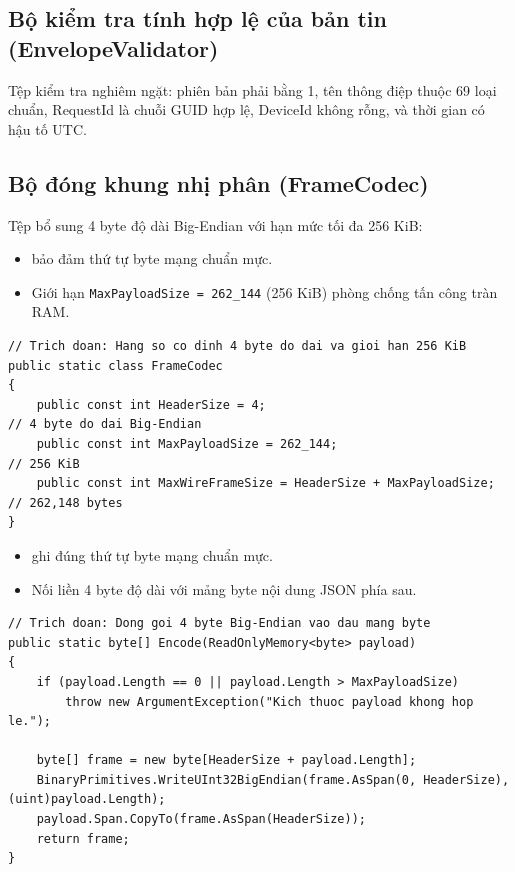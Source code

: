 \documentclass[12pt,a4paper]{article}
\begin{document}
\subsection{Bộ kiểm tra tính hợp lệ của bản tin (EnvelopeValidator)}
Tệp  kiểm tra nghiêm ngặt: phiên bản phải bằng 1, tên thông điệp thuộc 69 loại chuẩn, RequestId là chuỗi GUID hợp lệ, DeviceId không rỗng, và thời gian có hậu tố UTC.

\subsection{Bộ đóng khung nhị phân (FrameCodec)}
Tệp  bổ sung 4 byte độ dài Big-Endian với hạn mức tối đa 256 KiB:

\begin{orientationbox}
\begin{itemize}[leftmargin=1.5em, itemsep=1pt]
  \item {} bảo đảm thứ tự byte mạng chuẩn mực.
  \item Giới hạn \texttt{MaxPayloadSize = 262\_144} (256 KiB) phòng chống tấn công tràn RAM.
\end{itemize}
\end{orientationbox}

\begin{lstlisting}[language=CSharp, caption={Ví dụ rút gọn dựa trên mã nguồn hiện tại: Hằng số giới hạn trong FrameCodec.cs}]
// Trich doan: Hang so co dinh 4 byte do dai va gioi han 256 KiB
public static class FrameCodec
{
    public const int HeaderSize = 4;                                 // 4 byte do dai Big-Endian
    public const int MaxPayloadSize = 262_144;                       // 256 KiB
    public const int MaxWireFrameSize = HeaderSize + MaxPayloadSize; // 262,148 bytes
}
\end{lstlisting}

\begin{orientationbox}
\begin{itemize}[leftmargin=1.5em, itemsep=1pt]
  \item {} ghi đúng thứ tự byte mạng chuẩn mực.
  \item Nối liền 4 byte độ dài với mảng byte nội dung JSON phía sau.
\end{itemize}
\end{orientationbox}

\begin{lstlisting}[language=CSharp, caption={Ví dụ rút gọn dựa trên mã nguồn hiện tại: Phương thức Encode trong FrameCodec.cs}]
// Trich doan: Dong goi 4 byte Big-Endian vao dau mang byte
public static byte[] Encode(ReadOnlyMemory<byte> payload)
{
    if (payload.Length == 0 || payload.Length > MaxPayloadSize)
        throw new ArgumentException("Kich thuoc payload khong hop le.");

    byte[] frame = new byte[HeaderSize + payload.Length];
    BinaryPrimitives.WriteUInt32BigEndian(frame.AsSpan(0, HeaderSize), (uint)payload.Length);
    payload.Span.CopyTo(frame.AsSpan(HeaderSize));
    return frame;
}
\end{lstlisting}
\end{document}
